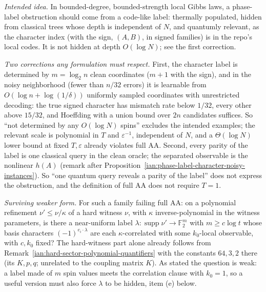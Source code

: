 \begin{remark}
\label{ian:phase-label-local-open-problem}
\emph{Intended idea.} In bounded-degree, bounded-strength local Gibbs
laws, a phase-label obstruction should come from a code-like label:
thermally populated, hidden from classical trees whose depth is
independent of \(N\), and quantumly relevant, as the character index
(with the sign, \((A,B)\), in signed families) is in the repo's local
codes. It is not hidden at depth \(O(\log N)\); see the first correction.

\emph{Two corrections any formulation must respect.} First, the
character label is determined by \(m=\log_2n\) clean coordinates
(\(m+1\) with the sign), and in
the noisy neighborhood (fewer than \(n/32\) errors) it is learnable from
\(O(\log n+\log(1/\delta))\) uniformly sampled coordinates with
unrestricted decoding: the true signed character has mismatch rate below
\(1/32\), every other above \(15/32\), and Hoeffding with a union bound
over \(2n\) candidates suffices. So ``not determined by any
\(O(\log N)\) spins'' excludes the intended examples; the relevant scale
is polynomial in \(T\) and \(\varepsilon^{-1}\), independent of \(N\), and
a \(\Theta(\log N)\) lower bound at fixed \(T,\varepsilon\) already
violates full AA. Second, every parity of the label is one classical
query in the clean oracle; the separated observable is the nonlinear
\(h(A)\) (remark after
Proposition~\ref{ian:phase-label-character-noisy-instances}). So ``one
quantum query reveals a parity of the label'' does not express the
obstruction, and the definition of full AA does not require \(T=1\).

\emph{Surviving weaker form.} For such a family failing full AA: on a
polynomial refinement \(\nu'\le\nu/\kappa\) of a hard witness \(\nu\),
with \(\kappa\) inverse-polynomial in the witness parameters, is there a
near-uniform label \(\lambda:\operatorname{supp}\nu'\to\mathbb F_2^m\)
with \(m\ge c\log t\) whose basis characters \((-1)^{e_i\cdot\lambda}\)
are each \(\kappa\)-correlated with some \(k_0\)-local observable, with
\(c,k_0\) fixed? The hard-witness part alone already follows from
Remark~\ref{ian:hard-sector-polynomial-quantifiers} with the constants
\(64,3,2\) there (its \(K,p,q\); unrelated to the coupling matrix \(K\)).
As stated the question is weak: a label made of \(m\) spin values meets
the correlation clause with \(k_0=1\), so a useful version must also
force \(\lambda\) to be hidden, item (e) below.


\end{remark}
